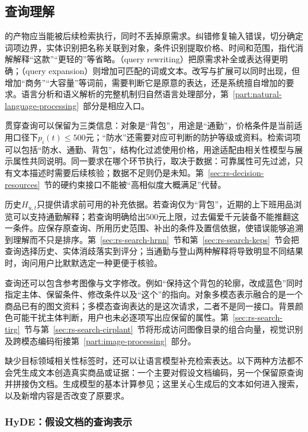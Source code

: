 \subsection{查询理解}
\label{sec:rs-search-query}

的产物应当能被后续检索执行，同时不丢掉原需求。纠错修复输入错误，切分确定词项边界，实体识别把名称关联到对象，条件识别提取价格、时间和范围，指代消解解释“这款”“更轻的”等省略。（query rewriting）把原需求补全或表达得更明确；（query expansion）则增加可匹配的词或文本。改写与扩展可以同时出现，但增加“商务”“大容量”等词前，需要判断它是原意的表达，还是系统擅自增加的要求。语言分析和语义解析的完整机制归自然语言处理部分，第~\ref{part:natural-language-processing}~部分是相应入口。

贯穿查询可以保留为三类信息：对象是“背包”，用途是“通勤”，价格条件是当前适用口径下$p_i(t)\leq500$元；“防水”还需要对应可判断的防护等级或资料。检索词项可以包括“防水、通勤、背包”，结构化过滤使用价格，用途适配由相关性模型与展示属性共同说明。同一要求在哪个环节执行，取决于数据：可靠属性可先过滤，只有文本描述时需要后续核验；数据不足则仍是未知。第~\ref{sec:rs-decision-resources}~节的硬约束接口不能被“高相似度大概满足”代替。

历史$H_{u,t}$只提供请求前可用的补充依据。若查询仅为“背包”，近期的上下班用品浏览可以支持通勤解释；若查询明确给出500元上限，过去偏爱千元装备不能推翻这一条件。应保存原查询、所用历史范围、补出的条件及置信依据，使错误能够追溯到理解而不只是排序。第~\ref{sec:rs-search-hrnn}~节和第~\ref{sec:rs-search-keps}~节会把查询选择历史、实体消歧落实到评分；当通勤与登山两种解释将导致明显不同结果时，询问用户比默默选定一种更便于核验。

查询还可以包含参考图像与文字修改。例如“保持这个背包的轮廓，改成蓝色”同时指定主体、保留条件、修改条件以及“这个”的指向。对象多模态表示融合的是一个商品已有的图文资料；多模态查询表达的是这次请求，二者不是同一接口。背景颜色可能干扰主体判断，用户也未必逐项写出应保留的属性。第~\ref{sec:rs-search-tirg}~节与第~\ref{sec:rs-search-cirplant}~节将形成访问图像目录的组合向量，视觉识别及跨模态编码衔接第~\ref{part:image-processing}~部分。

缺少目标领域相关性标签时，还可以让语言模型补充检索表达。以下两种方法都不会凭生成文本创造真实商品或证据：一个主要对假设文档编码，另一个保留原查询并拼接伪文档。生成模型的基本计算参见；这里关心生成后的文本如何进入搜索，以及新增内容是否改变了原要求。

\Needspace{100mm}
\subsubsection{HyDE：假设文档的查询表示}
\label{sec:rs-search-hyde}

